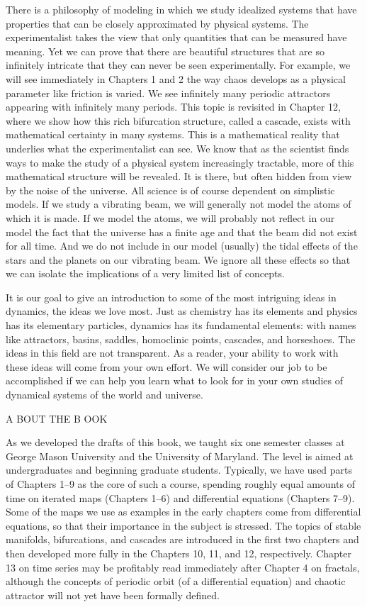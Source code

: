 \documentclass[12pt]{article}
\begin{document}
There is a philosophy of modeling in which we study idealized systems that have properties that can be 
closely approximated by physical systems. The experimentalist takes the view that only quantities that can 
be measured have meaning. Yet we can prove that there are beautiful structures that are so infinitely 
intricate that they can never be seen experimentally. For example, we will see immediately in Chapters 1 
and 2 the way chaos develops as a physical parameter like friction is varied. We see infinitely many 
periodic attractors appearing with infinitely many periods. This topic is revisited in Chapter 12, where we 
show how this rich bifurcation structure, called a cascade, exists with mathematical certainty in many 
systems. 
This is a mathematical reality that underlies what the experimentalist can see. We know that as the 
scientist finds ways to make the study of a physical system increasingly tractable, more of this 
mathematical structure will be revealed. It is there, but often hidden from view by the noise of the 
universe. All science is of course dependent on simplistic models. If we study a vibrating beam, we will 
generally not model the atoms of which it is made. If we model the atoms, we will probably not reflect in 
our model the fact that the universe has a finite age and that the beam did not exist for all time. And we 
do not include in our model (usually) the tidal effects of the stars and the planets on our vibrating beam. 
We ignore all these effects so that we can isolate the implications of a very limited list of concepts.

It is our goal to give an introduction to some of the most intriguing ideas in dynamics, the ideas we love 
most. Just as chemistry has its elements and physics has its elementary particles, dynamics has its 
fundamental elements: with names like attractors, basins, saddles, homoclinic points, cascades, and 
horseshoes. The ideas in this field are not transparent. As a reader, your ability to work with these ideas 
will come from your own effort. We will consider our job to be accomplished if we can help you learn what 
to look for in your own studies of dynamical systems of the world and universe.

A BOUT THE B OOK

As we developed the drafts of this book, we taught six one semester classes at George Mason University and 
the University of Maryland. The level is aimed at undergraduates and beginning graduate students. 
Typically, we have used parts of Chapters 1–9 as the core of such a course, spending roughly equal amounts 
of time on iterated maps (Chapters 1–6) and differential equations (Chapters 7–9). Some of the maps we use 
as examples in the early chapters come from differential equations, so that their importance in the subject 
is stressed. The topics of stable manifolds, bifurcations, and cascades are introduced in the first two 
chapters and then developed more fully in the Chapters 10, 11, and 12, respectively. Chapter 13 on time 
series may be profitably read immediately after Chapter 4 on fractals, although the concepts of periodic 
orbit (of a differential equation) and chaotic attractor will not yet have been formally defined.
\end{document}
